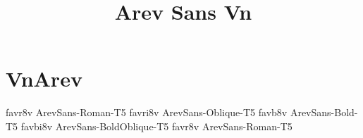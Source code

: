 \documentclass[sample]{vnsample}
\title{Arev Sans Vn}
\begin{document}
\section{VnArev}
  {favr8v}  {ArevSans-Roman-T5}
 {favri8v} {ArevSans-Oblique-T5}
  {favb8v}  {ArevSans-Bold-T5}
 {favbi8v} {ArevSans-BoldOblique-T5}
  {favr8v}  {ArevSans-Roman-T5}
\end{document}
